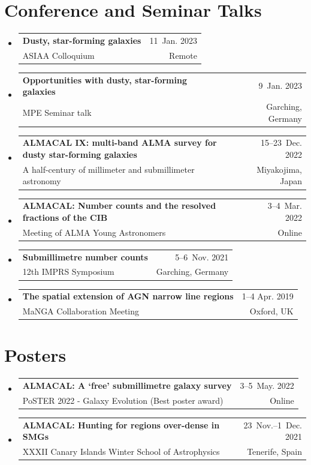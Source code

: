 \documentclass[A4,11pt]{article}
\makeatletter
\newcommand{\CVSubheading}[4]{
  \vspace{-2pt}\item
    \begin{tabular*}{0.97\textwidth}[t]{l@{\extracolsep{\fill}}r}
      \textbf{#1} & #2 \\
      \small#3 & \small #4 \\
    \end{tabular*}\vspace{-7pt}
}
\newcommand{\CVSubHeadingListStart}{\begin{itemize}[leftmargin=0.5cm, label={}]}
\newcommand{\CVSubHeadingListEnd}{\end{itemize}}
\makeatother
\begin{document}
\section{Conference and Seminar Talks}
  \CVSubHeadingListStart
    \CVSubheading
      {Dusty, star-forming galaxies}{11~Jan. 2023}
      {ASIAA Colloquium}{Remote}
    \CVSubheading
      {Opportunities with dusty, star-forming galaxies}{9~Jan. 2023}
      {MPE Seminar talk}{Garching, Germany}
    \CVSubheading
      {ALMACAL IX: multi-band ALMA survey for dusty star-forming galaxies}{15--23~Dec. 2022}
      {A half-century of millimeter and submillimeter astronomy}{Miyakojima, Japan}
    \CVSubheading
      {ALMACAL: Number counts and the resolved fractions of the CIB}{3--4~Mar. 2022}
      {Meeting of ALMA Young Astronomers}{Online}
    \CVSubheading
      {Submillimetre number counts}{5--6~Nov. 2021}
      {12th IMPRS Symposium}{Garching, Germany}
    \CVSubheading
      {The spatial extension of AGN narrow line regions}{1--4 Apr. 2019}
      {MaNGA Collaboration Meeting}{Oxford, UK}
  \CVSubHeadingListEnd

\section{Posters}
  \CVSubHeadingListStart
    \CVSubheading
      {ALMACAL: A `free' submillimetre galaxy survey}{3--5~May. 2022}
      {PoSTER 2022 - Galaxy Evolution (Best poster award)}{Online}
    \CVSubheading
      {ALMACAL: Hunting for regions over-dense in SMGs}{23~Nov.--1~Dec. 2021}
      {XXXII Canary Islands Winter School of Astrophysics}{Tenerife, Spain}
  \CVSubHeadingListEnd

\end{document}
